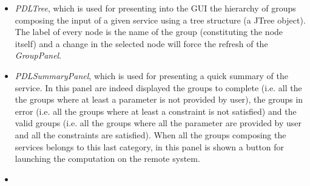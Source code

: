 \documentclass[a4paper,11pt] {ivoa}
\begin{document}
\begin{itemize}
\item {\it PDLTree}, which is used for presenting into the GUI the hierarchy of groups composing the input of a given service using a tree structure (a JTree object). The label of every node is the name of the group (constituting the node itself) and a change in the selected node will force the refresh of the {\it GroupPanel}.
\item {\it PDLSummaryPanel}, which is used for presenting a quick summary of the service. In this panel are indeed displayed the groups to complete (i.e. all the the groups where at least a parameter is not provided by user), the groups in error (i.e. all the groups where at least a constraint is not satisfied) and the valid groups (i.e. all the groups where all the parameter are provided by user and all the constraints are satisfied). When all the groups composing the services belongs to this last category, in this panel is shown a button for launching the computation on the remote system.
\item 
\end{itemize}
\end{document}
